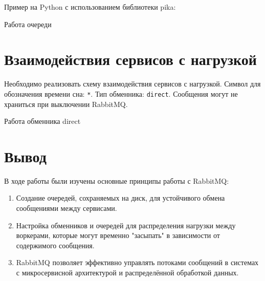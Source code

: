 Пример на Python с использованием библиотеки pika:





\begin{image}
    \caption{Работа очереди}
    \label{fig:simply}
\end{image}

\clearpage

\section{Взаимодействия сервисов с нагрузкой}

Необходимо реализовать схему взаимодействия сервисов с нагрузкой.
Символ для обозначения времени сна: \texttt{*}. Тип обменника: \texttt{direct}.
Сообщения могут не храниться при выключении RabbitMQ.



\break



\begin{image}
    \caption{Работа обменника direct}
    \label{fig:direct}
\end{image}

\clearpage

\section*{\LARGE Вывод}

В ходе работы были изучены основные принципы работы с RabbitMQ:

\begin{enumerate}
	\item Создание очередей, сохраняемых на диск,
		для устойчивого обмена сообщениями между сервисами.
	\item Настройка обменников
		и очередей для распределения нагрузки между воркерами,
		которые могут временно "засыпать"
		в зависимости от содержимого сообщения.
	\item RabbitMQ позволяет эффективно управлять потоками сообщений
		в системах с микросервисной архитектурой
		и распределённой обработкой данных.
\end{enumerate}


